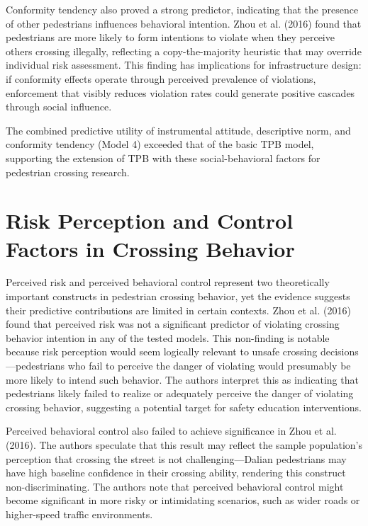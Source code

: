 \documentclass{article}
\begin{document}
Conformity tendency also proved a strong predictor, indicating that the presence of other pedestrians influences behavioral intention. Zhou et al. (2016) found that pedestrians are more likely to form intentions to violate when they perceive others crossing illegally, reflecting a copy-the-majority heuristic that may override individual risk assessment. This finding has implications for infrastructure design: if conformity effects operate through perceived prevalence of violations, enforcement that visibly reduces violation rates could generate positive cascades through social influence. \cite{08_2016_zhou_aap}

The combined predictive utility of instrumental attitude, descriptive norm, and conformity tendency (Model 4) exceeded that of the basic TPB model, supporting the extension of TPB with these social-behavioral factors for pedestrian crossing research. \cite{08_2016_zhou_aap}

\section{Risk Perception and Control Factors in Crossing Behavior}
Perceived risk and perceived behavioral control represent two theoretically important constructs in pedestrian crossing behavior, yet the evidence suggests their predictive contributions are limited in certain contexts. Zhou et al. (2016) found that perceived risk was not a significant predictor of violating crossing behavior intention in any of the tested models. This non-finding is notable because risk perception would seem logically relevant to unsafe crossing decisions—pedestrians who fail to perceive the danger of violating would presumably be more likely to intend such behavior. The authors interpret this as indicating that pedestrians likely failed to realize or adequately perceive the danger of violating crossing behavior, suggesting a potential target for safety education interventions. \cite{08_2016_zhou_aap}

Perceived behavioral control also failed to achieve significance in Zhou et al. (2016). The authors speculate that this result may reflect the sample population's perception that crossing the street is not challenging—Dalian pedestrians may have high baseline confidence in their crossing ability, rendering this construct non-discriminating. The authors note that perceived behavioral control might become significant in more risky or intimidating scenarios, such as wider roads or higher-speed traffic environments. \cite{08_2016_zhou_aap}
\end{document}
